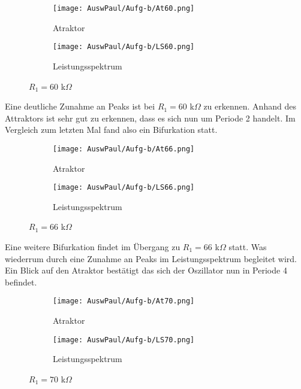 \begin{figure}[h]
    \centering
    \begin{subfigure}[b]{0.45\textwidth}
        \centering
        \texttt{[image: AuswPaul/Aufg-b/At60.png]}
        \caption{Atraktor}
    \end{subfigure}
    \hfill
    \begin{subfigure}[b]{0.45\textwidth}
        \centering
        \texttt{[image: AuswPaul/Aufg-b/LS60.png]}
        \caption{Leistungsspektrum}
    \end{subfigure}
    \caption{$R_1 = 60$ k$\Omega$}
\end{figure}

Eine deutliche Zunahme an Peaks ist bei $R_1 = 60$ k$\Omega$ zu erkennen. Anhand des Attraktors ist sehr gut zu erkennen, dass es sich nun um Periode 2 handelt. Im Vergleich zum letzten Mal fand also ein Bifurkation statt.

\begin{figure}[h]
    \centering
    \begin{subfigure}[b]{0.45\textwidth}
        \centering
        \texttt{[image: AuswPaul/Aufg-b/At66.png]}
        \caption{Atraktor}
    \end{subfigure}
    \hfill
    \begin{subfigure}[b]{0.45\textwidth}
        \centering
        \texttt{[image: AuswPaul/Aufg-b/LS66.png]}
        \caption{Leistungsspektrum}
    \end{subfigure}
    \caption{$R_1 = 66$ k$\Omega$}
\end{figure}

Eine weitere Bifurkation findet im Übergang zu $R_1 = 66$ k$\Omega$ statt. Was wiederrum durch eine Zunahme an Peaks im Leistungsspektrum begleitet wird. Ein Blick auf den Atraktor bestätigt das sich der Oszillator nun in Periode 4 befindet.
\newpage
\begin{figure}[h]
    \centering
    \begin{subfigure}[b]{0.45\textwidth}
        \centering
        \texttt{[image: AuswPaul/Aufg-b/At70.png]}
        \caption{Atraktor}
    \end{subfigure}
    \hfill
    \begin{subfigure}[b]{0.45\textwidth}
        \centering
        \texttt{[image: AuswPaul/Aufg-b/LS70.png]}
        \caption{Leistungsspektrum}
    \end{subfigure}
    \caption{$R_1 = 70$ k$\Omega$}
\end{figure}

